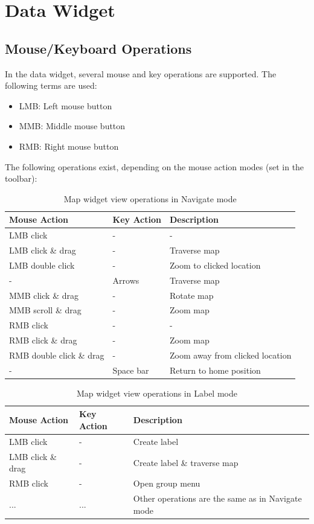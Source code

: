 \section{Data Widget}
\label{sec:osgview_data}

\subsection{Mouse/Keyboard Operations}
In the data widget, several mouse and key operations are supported. The following terms are used:

\begin{itemize}
 \item LMB: Left mouse button
 \item MMB: Middle mouse button
 \item RMB: Right mouse button
\end{itemize}

The following operations exist, depending on the mouse action modes (set in the toolbar):

\begin{table}[H]
  \center
  \begin{tabular}{ | l | l | l |}
    \hline
    \textbf{Mouse Action} & \textbf{Key Action} &  \textbf{Description} \\ \hline
    LMB click & - & - \\ \hline
    LMB click \& drag & - & Traverse map \\ \hline
    LMB double click & - & Zoom to clicked location \\ \hline
    - & Arrows & Traverse map \\ \hline
    MMB click \& drag & - & Rotate map \\ \hline
    MMB scroll \& drag & - & Zoom map \\ \hline
    RMB click & - & - \\ \hline
    RMB click \& drag & - & Zoom map \\ \hline
    RMB double click \& drag & - & Zoom away from clicked location \\ \hline
    - & Space bar & Return to home position \\ \hline
  \end{tabular}
  \caption{Map widget view operations in Navigate mode}
\end{table}

\begin{table}[H]
  \center
  \begin{tabular}{ | l | l | l |}
    \hline
    \textbf{Mouse Action} & \textbf{Key Action} &  \textbf{Description} \\ \hline
    LMB click & - & Create label \\ \hline
    LMB click \& drag & - & Create label \& traverse map \\ \hline
    RMB click & - & Open group menu \\ \hline
    ... & ... & Other operations are the same as in Navigate mode \\ \hline
  \end{tabular}
  \caption{Map widget view operations in Label mode}
\end{table}

